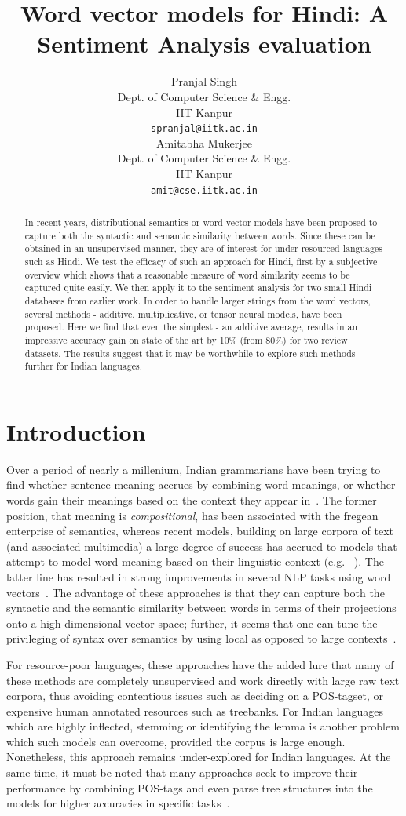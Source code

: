 \def\DevnagVersion{2.15}\documentclass[11pt]{article}
\title{Word vector models for Hindi: A  Sentiment Analysis evaluation}
\author{Pranjal Singh \\
  Dept. of Computer Science \& Engg. \\
  IIT Kanpur \\
  {\tt spranjal@iitk.ac.in} \\\And
  Amitabha Mukerjee \\
  Dept. of Computer Science \& Engg. \\
  IIT Kanpur \\
  {\tt amit@cse.iitk.ac.in} \\}
\date{}
\begin{document}
\maketitle
\begin{abstract}
In recent years, distributional semantics or word vector models
have been proposed to capture both the syntactic and semantic similarity
between words.  Since these can be obtained in an unsupervised manner, they
are of interest for under-resourced languages such as Hindi.  We test the
efficacy of such an approach for Hindi, first by a subjective overview which
shows that a reasonable measure of word similarity seems to be captured
quite easily.  We then apply it to the sentiment analysis for
two small Hindi databases from earlier work.  In order to
handle larger strings from the word vectors, 
several methods - additive, multiplicative, or tensor neural
models, have been proposed.  Here we find that even the simplest - an additive
average, results in an impressive
accuracy gain on state of the art by 10\% (from 80\%) for
two review datasets.  The results suggest that
it may be worthwhile to explore such methods further for Indian languages.
\end{abstract}


\section{Introduction}
Over a period of nearly a millenium, Indian grammarians have been trying to find whether sentence meaning accrues by combining word
meanings, or whether words gain their meanings based on the context they
appear in~\cite{Matilal:90}.  The former position, that
meaning is {\em compositional}, has been associated with the fregean
enterprise of semantics, whereas recent models, building on large corpora of
text (and associated multimedia) a large degree of success has accrued to
models that attempt to model word meaning based on their linguistic context
(e.g. ~\cite{Landauer:97}).  The latter line has resulted in strong improvements in several NLP tasks using word vectors~\cite{Collobert:08,Turian:10,Mikolov:13a,Socher:13}. 
The advantage of these approaches is that they can capture both the syntactic
and the semantic similarity between words in terms of their projections onto
a high-dimensional vector space; further, it seems that one can tune the
privileging of syntax over semantics by using local as opposed to large contexts~\cite{Huang:12}. 

For resource-poor languages, these approaches have the added lure
that many of these methods are completely unsupervised and work directly with
large raw text corpora, thus
avoiding contentious issues such as deciding on a POS-tagset, or expensive
human annotated resources such as treebanks.  For Indian languages which are
highly inflected, stemming or identifying the lemma is another problem
which such models can overcome, provided the corpus is large enough.
Nonetheless, this approach remains under-explored for Indian languages.
At the same time, it must 
be noted that many approaches seek to improve their performance
by combining POS-tags and even parse tree structures
into the models for higher accuracies in specific tasks~\cite{Socher:13}. 
\end{document}
